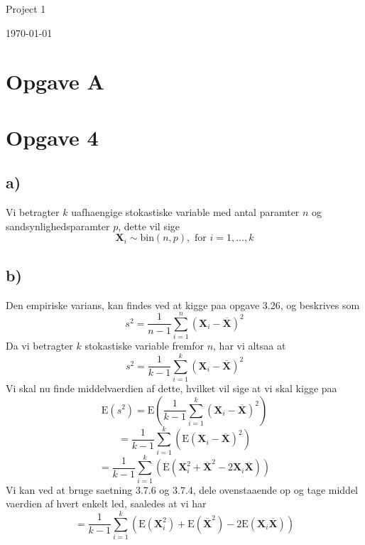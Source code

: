 \documentclass[a4paper,11pt]{article}
\begin{document}
\begin{center}
{\LARGE Project 1}
\begin{flushright}
\small \today
\end{flushright}
\end{center}

\newcommand{\ud}{\, \mathrm{d}}
\newcommand{\mb}[1]{\mathbf{#1}}
\newcommand{\tr}[1]{\textrm{#1}}
\newcommand{\indep}{{\;\bot\!\!\!\!\!\!\bot\;}}

\newenvironment{nospace}%
{\noindent\ignorespaces}%
{\par\noindent%
  \ignorespacesafterend}
\section*{Opgave A}


\section*{Opgave 4}
\subsection*{a)}
Vi betragter $k$ uafhaengige stokastiske variable med antal paramter $n$ og sandsynlighedsparamter $p$, dette vil sige
\[
\mathbf{X}_i \sim{ \textrm{bin} \left( n,p \right) } , \textrm{ for } i = 1,\dots,k
\]


\subsection*{b)}
Den empiriske varians, kan findes ved at kigge paa opgave 3.26, og beskrives som
\[
s^2 = \frac{1}{n-1}\sum_{i = 1}^{n}\left(\mathbf{X}_i - \mathbf{\overline{X}}\right)^2
\]
Da vi betragter $k$ stokastiske variable fremfor $n$, har vi altsaa at
\[
s^2 = \frac{1}{k-1}\sum_{i = 1}^{k}\left(\mathbf{X}_i - \mathbf{\overline{X}}\right)^2
\]
Vi skal nu finde middelvaerdien af dette, hvilket vil sige at vi skal kigge paa
\[
\textrm{E}(s^2) = \textrm{E}\left( \frac{1}{k-1}\sum_{i = 1}^{k}\left(\mathbf{X}_i - \mathbf{\overline{X}}\right)^2 \right)
\]
\[
= \frac{1}{k-1}\sum_{i = 1}^{k} \left( \textrm{E}\left(\mathbf{X}_i - \mathbf{\overline{X}} \right)^{2}\right)
\]
\[
= \frac{1}{k-1}\sum_{i = 1}^{k} \left( \textrm{E}\left(\mathbf{X}_{i}^{2} + \mathbf{\overline{X}}^{2} - 2\mathbf{X}_i\mathbf{\overline{X}} \right) \right)
\]
Vi kan ved at bruge saetning 3.7.6 og 3.7.4, dele ovenstaaende op og tage middel vaerdien af hvert enkelt led, saaledes at vi har
\[
= \frac{1}{k-1} \sum_{i = 1}^{k} \left( \textrm{E} \left( \mathbf{X}_{i}^{2} \right) + \textrm{E} \left( \mathbf{\overline{X}}^{2} \right) - 2 \textrm{E} \left( \mathbf{X}_i \mathbf{\overline{X}} \right) \right)
\]
\end{document}
